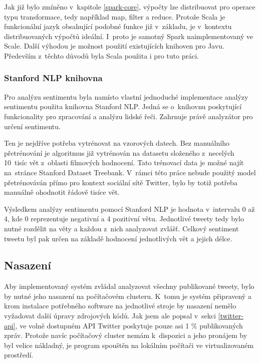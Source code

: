 \documentclass[thesis=B,czech]{FITthesis}[2012/06/26]
\begin{document}
Jak již bylo zmíněno v~kapitole \ref{spark-core}, výpočty lze distribuovat pro operace typu transformace, tedy například map, filter a reduce. Protože Scala je funkcionální jazyk obsahující podobné funkce již v~základu, je v~kontextu distribuovaných výpočtů ideální. I~proto je samotný Spark naimplementovaný ve Scale\cite{spark-scala}. Další výhodou je možnost použití existujících knihoven pro Javu. Především z~těchto důvodů byla Scala použita i pro tuto práci. 

\subsubsection{Stanford NLP knihovna}
\label{stanford-nlp}
	Pro analýzu sentimentu byla namísto vlastní jednoduché implementace analýzy sentimentu použita knihovna Stanford NLP\cite{stanford-nlp-web}. Jedná se o~knihovnu poskytující funkcionality pro zpracování a analýzu lidské řeči. Zahrnuje právě analyzátor pro určení sentimentu. 
	
	Ten je nejdříve potřeba vytrénovat na vzorových datech. Bez manuálního přetrénování je algoritmus již vytrénován na datasetu složeného z~necelých 10~tisíc vět z~oblasti filmových hodnocení. Tato trénovací data je možné najít na~stránce Stanford Dataset Treebank\cite{nlp-treebank}. V~rámci této práce nebude použitý model přetrénováván přímo pro kontext sociální sítě Twitter, bylo by totiž potřeba manuálně ohodnotit řádově tisíce vět. 
	
	Výsledkem analýzy sentimentu pomocí Stanford NLP je hodnota v~intervalu 0 až 4, kde 0 reprezentuje negativní a 4 pozitivní větu. Jednotlivé tweety tedy bylo nutné rozdělit na věty a každou z~nich analyzovat zvlášť. Celkový sentiment tweetu byl pak určen na základě hodnocení jednotlivých vět a jejich délce. 

\subsection{Nasazení}
Aby implementovaný systém zvládal analyzovat všechny publikované tweety, bylo by nutné jeho nasazení na počítačovém clusteru. K~tomu je systém připravený a krom instalace potřebného software na jednotlivé stroje by nasazení nemělo vyžadovat další úpravy zdrojových kódů. Jak jsem ale popsal v~sekci \ref{twitter-api}, ve volně dostupném API Twitter poskytuje pouze asi 1 \% publikovaných zpráv. Protože navíc počítačový cluster nemám k~dispozici a jeho pronájem by byl velice nákladný, je program spouštěn na lokálním počítači ve virtualizovaném prostředí. 
\end{document}
